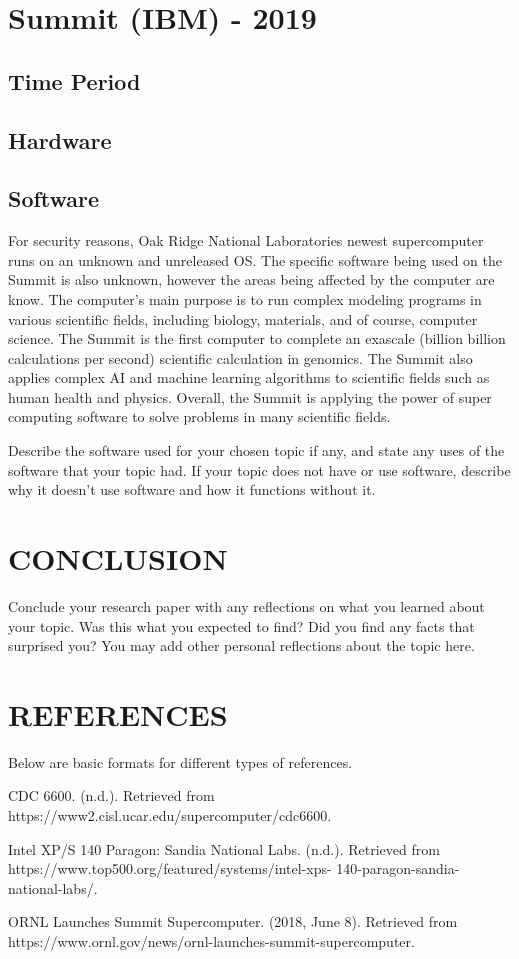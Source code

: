 \documentclass[letterpaper, 10 pt, conference]{IEEEconf}
\begin{document}
\section{Summit (IBM) - 2019}
\subsection{Time Period}
\subsection{Hardware}
\subsection{Software}
For security reasons, Oak Ridge National Laboratories newest
supercomputer runs on an unknown and unreleased OS. The specific
software being used on the Summit is also unknown, however the
areas being affected by the computer are know. The computer's main
purpose is to run complex modeling programs in various scientific
fields, including biology, materials, and of course, computer
science. The Summit is the first computer to complete an exascale
(billion billion calculations per second) scientific calculation
in genomics. The Summit also applies complex AI and machine
learning algorithms to scientific fields such as human health and
physics. Overall, the Summit is applying the power of super
computing software to solve problems in many scientific fields.

Describe the software used for your chosen topic if any,
and state any uses of the software that your topic had.
If your topic does not have or use software, describe why it
doesn't use software and how it functions without it.

\section{CONCLUSION}

Conclude your research paper with any reflections on what you
learned about your topic. Was this what you expected to find?
Did you find any facts that surprised you? You may add other
personal reflections about the topic here.

\section*{REFERENCES}

Below are basic formats for different types of references.

\begin{enumerate}[label={[\arabic*]}]
\item CDC 6600. (n.d.). Retrieved from
https://www2.cisl.ucar.edu/supercomputer/cdc6600.
\item Intel XP/S 140 Paragon: Sandia National Labs. (n.d.).
Retrieved from https://www.top500.org/featured/systems/intel-xps-
140-paragon-sandia-national-labs/.
\item ORNL Launches Summit Supercomputer. (2018, June 8).
Retrieved from 
https://www.ornl.gov/news/ornl-launches-summit-supercomputer.
\end{enumerate}
\end{document}
